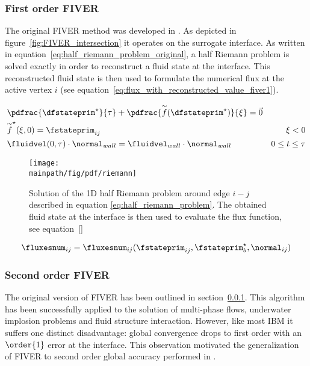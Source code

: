\documentclass[../main.tex]{subfiles}
\begin{document}
\subsubsection{First order \ac{FIVER}}\label{sec:fiver-1}
The original \ac{FIVER} method was developed in \cite{Farhat2008}. As depicted in figure~\ref{fig:FIVER_intersection} it operates on the surrogate interface. As written in equation~\eqref{eq:half_riemann_problem_original}, a half Riemann problem is solved exactly in order to reconstruct a fluid state at the interface. This reconstructed fluid state is then used to formulate the numerical flux at the active vertex $i$ (see equation~\eqref{eq:flux_with_reconstructed_value_fiver1}).


\begin{align}\label{eq:half_riemann_problem_original}
&\pdfrac{\dfstateprim^{\star}}{\tau} + \pdfrac{\overset{\sim}{f}(\dfstateprim^{\star})}{\xi} = \vec{0} & \nonumber\\
&\overset{\sim}{f}^{\star}(\xi,0)=\fstateprim_{ij}                                                     & \xi<0 \nonumber\\
&\fluidvel(0,\tau)\cdot \normal_{wall} = \fluidvel_{wall}\cdot\normal_{wall}                          & 0\leq t \leq \tau
\end{align}

\begin{figure}[h!]
	\begin{center}
        \texttt{[image: \\mainpath/fig/pdf/riemann]}
        \caption[Riemann Sketch]{Solution of the 1D half Riemann problem around edge $i-j$ described in equation \eqref{eq:half_riemann_problem}. The obtained fluid state at the interface is then used to evaluate the flux function, see equation~\eqref{}}
		\label{fig:riemann_sketch}
    \end{center}
\end{figure}

\begin{align}\label{eq:flux_with_reconstructed_value_fiver1}
\fluxesnum_{ij}=\fluxesnum_{ij}(\fstateprim_{ij},\fstateprim^{\star}_b, \normal_{ij})
\end{align}



\subsubsection{Second order \ac{FIVER}}\label{sec:fiver-2}
The original version of \ac{FIVER} has been outlined in section~\ref{sec:fiver-1}. This algorithm has been successfully applied to the solution of multi-phase flows, underwater implosion problems and fluid structure interaction. However, like most \ac{IBM} it suffers one distinct disadvantage: global convergence drops to first order with an $\order{1}$ error at the interface. This observation motivated the generalization of FIVER to second order global accuracy performed in \cite{Main2014}.\\
\end{document}
